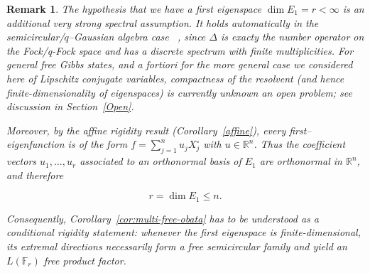 \documentclass[10pt,a4paper,reqno]{amsart}
\newtheorem{remark}[theorem]{Remark}
\begin{document}
\begin{remark}
The hypothesis that we have a first eigenspace $\dim E_1 = r < \infty$ is an additional very strong \emph{spectral assumption}.
It holds automatically in the semicircular/$q$--Gaussian algebra case~ \cite{Bozejko}, since $\Delta$
is exacty the \emph{number operator} on the Fock/q-Fock space and has a discrete spectrum with finite multiplicities.
For general free Gibbs states, and a fortiori for the more general case we considered here of \emph{Lipschitz conjugate variables}, compactness of the resolvent (and hence
finite-dimensionality of eigenspaces) is currently unknown an open problem; see discussion in 
Section~\ref{Open}.

Moreover, by the affine rigidity result (Corollary~\ref{affine}), every
first--eigenfunction is of the form
$f = \sum_{j=1}^n u_j X_j^\circ$ with $u \in \mathbb{R}^n$.
Thus the coefficient vectors $u_1,\ldots,u_r$ associated to an orthonormal basis
of $E_1$ are orthonormal in $\mathbb{R}^n$, and therefore


\[
r = \dim E_1 \le n.
\]


Consequently, Corollary~\ref{cor:multi-free-obata} has to be understood as a conditional rigidity
statement: whenever the first eigenspace is finite-dimensional, its extremal
directions necessarily form a free semicircular family and yield an
$L(\mathbb{F}_r)$ free product factor.
\end{remark}
\end{document}
